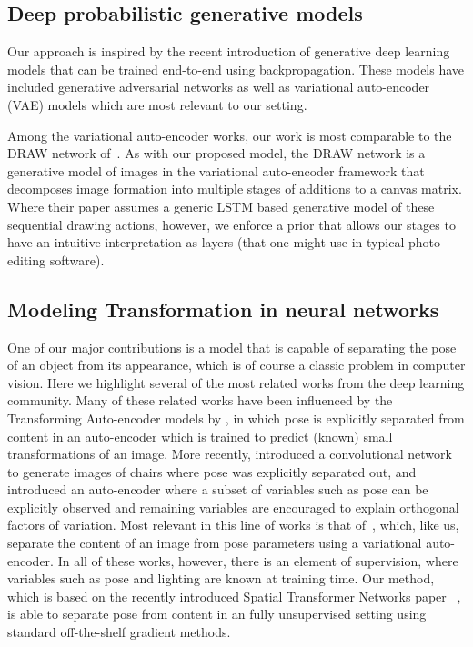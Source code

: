 \label{sec:related}
\vspace{-2mm}

\subsection{Deep probabilistic generative models}
\vspace{-2mm}
Our approach is inspired by the recent introduction of generative deep learning models that can be
trained end-to-end using backpropagation.  These models have included
generative adversarial networks \citep{denton2015deep, goodfellow2014generative}
as well as variational auto-encoder (VAE) models \citep{Kingma2014,kingma2014semi,rezende2014stochastic,burda2015importance}
which are most relevant to our setting.  

Among the variational auto-encoder works, our work is most comparable to 
the DRAW network of~\cite{gregor2015draw}.  As with our proposed model, 
the DRAW network is a generative model of images in the variational auto-encoder framework
that decomposes image formation into multiple stages of additions to a canvas matrix.  
Where their paper assumes a generic LSTM based generative model of these sequential 
drawing actions, however, we enforce a prior that allows our stages to have an intuitive interpretation
as layers (that one might use in typical photo editing software).


\vspace{-2mm}
\subsection{Modeling Transformation in neural networks}\vspace{-2mm}
One of our major contributions is a model that is capable of separating the pose of an object from its appearance,
which is of course a classic problem in computer vision.
Here we highlight several of the most related works from 
the deep learning community.  
Many of these  related works have been influenced by the Transforming Auto-encoder models by \cite{hinton2011transforming},
in which pose is explicitly separated from content in an auto-encoder which is trained to predict (known)
small transformations of an image.
More recently,  \cite{dosovitskiy2014learning} introduced a convolutional network to generate images of chairs where pose was explicitly separated out, and \cite{cheung2014discovering} introduced an auto-encoder where a subset of variables such as pose can be explicitly observed and remaining
variables are encouraged to explain orthogonal factors of variation.   
Most relevant in this line of works is that of~\cite{kulkarni2015deep}, which, like us, 
separate the content of an image from pose parameters using a variational auto-encoder.
In all of these works, however, there is an element of supervision, where variables such as pose
and lighting are known at training time. 
Our method,
which is based on the recently introduced Spatial
Transformer Networks paper
 ~\citep{jaderberg2015spatial},
is able to separate pose from content in an fully unsupervised setting 
using standard off-the-shelf gradient methods.


